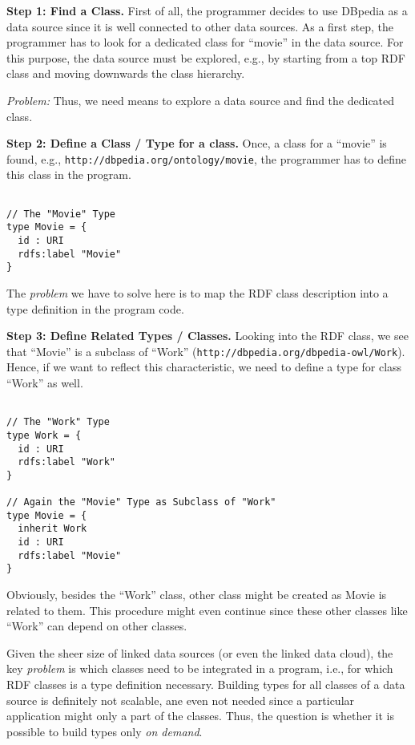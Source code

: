 \documentclass{llncs} %
\begin{document}
\vspace{0.8em}
\noindent
\textbf{Step 1: Find a Class.}
First of all, the programmer decides to use DBpedia as a data source since it is well connected to other
data sources. As a first step, the programmer has to look for a dedicated class for ``movie'' in the data source.
For this purpose, the data source must be explored, e.g., by starting from a top RDF class and moving downwards the class hierarchy.

\emph{Problem:} Thus, we need means to explore a data source and find the dedicated class.

\vspace{0.8em}
\noindent
\textbf{Step 2: Define a Class / Type for  a class.}
Once, a class for a ``movie'' is found, e.g., \texttt{http://dbpedia.org/ontology/movie}, the programmer has
to define this class in the program.

\begin{lstlisting}[style=code, caption={Type Definition for RDF Class ``Movie''}, label={lst:movietype}]

// The "Movie" Type
type Movie = {
  id : URI
  rdfs:label "Movie"
}
\end{lstlisting}

The \emph{problem} we have to solve here is to map the RDF class description into a type definition in the program code.

\vspace{0.8em}
\noindent
\textbf{Step 3: Define Related Types / Classes.}
Looking into the RDF class, we see that ``Movie'' is a subclass of ``Work'' (\texttt{http://dbpedia.org/dbpedia-owl/Work}).
Hence, if we want to reflect this characteristic, we need to define a type for class ``Work'' as well.

\begin{lstlisting}[style=code, caption={Type Definition for RDF Class ``Movie'' and ``Work''}, label={lst:worktype}]

// The "Work" Type
type Work = {
  id : URI
  rdfs:label "Work"
}

// Again the "Movie" Type as Subclass of "Work"
type Movie = {
  inherit Work
  id : URI
  rdfs:label "Movie"
}
\end{lstlisting}


Obviously, besides the ``Work'' class, other class might be created as Movie is related to them. This procedure might even continue since
these other classes like ``Work'' can depend on other classes.

Given the sheer size of linked data sources (or even the linked data cloud), the key \emph{problem} is which classes need to be 
integrated in a program, i.e., for which RDF classes is a type definition necessary. Building types for all classes of a
data source is definitely not scalable, ane even not needed since a particular application 
might only a part of the classes.
Thus, the question is whether it is possible to build types only \emph{on demand}.
\end{document}
